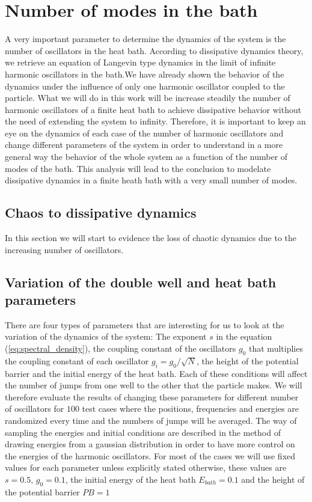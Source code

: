 \section{Number of modes in the bath}
A very important parameter to determine the dynamics of the system is the number of oscillators in the heat bath. According to dissipative dynamics theory, we retrieve an equation of Langevin type dynamics in the limit of infinite harmonic oscillators in the bath.We have already shown the behavior of the dynamics under the influence of only one harmonic oscillator coupled to the particle. What we will do in this work will be increase steadily the number of harmonic oscillators of a finite heat bath to achieve dissipative behavior without the need of extending the system to infinity. Therefore, it is important to keep an eye on the dynamics of each case of the number of harmonic oscillators and change different parameters of the system in order to understand in a more general way the behavior of the whole system as a function of the number of modes of the bath. This analysis will lead to the conclusion to modelate dissipative dynamics in a finite heath bath with a very small number of modes.

\subsection{Chaos to dissipative dynamics}
In this section we will start to evidence the loss of chaotic dynamics due to the increasing number of oscillators. 


\subsection{Variation of the double well and heat bath parameters}
There are four types of parameters that are interesting for us to look at the variation of the dynamics of the system: The exponent $s$ in the  equation (\ref{eq:spectral_density}), the coupling constant of the oscillators $g_0$ that multiplies the coupling constant of each oscillator $g_i=g_0/\sqrt{N}$, the height of the potential barrier and the initial energy of the heat bath. Each of these conditions will affect the number of jumps from one well to the other that the particle makes. We will therefore evaluate the results of changing these parameters for different number of oscillators for $100$ test cases where the positions, frequencies and energies are randomized every time and the numbers of jumps will be averaged. The way of sampling the energies and initial conditions are described in the method of drawing energies from a gaussian distribution in order to have more control on the energies of the harmonic oscillators. For most of the cases we will use fixed values for each parameter unless explicitly stated otherwise, these values are $s=0.5$, $g_0=0.1$, the initial energy of the heat bath $E_{bath}=0.1$ and the height of the potential barrier $PB=1$

